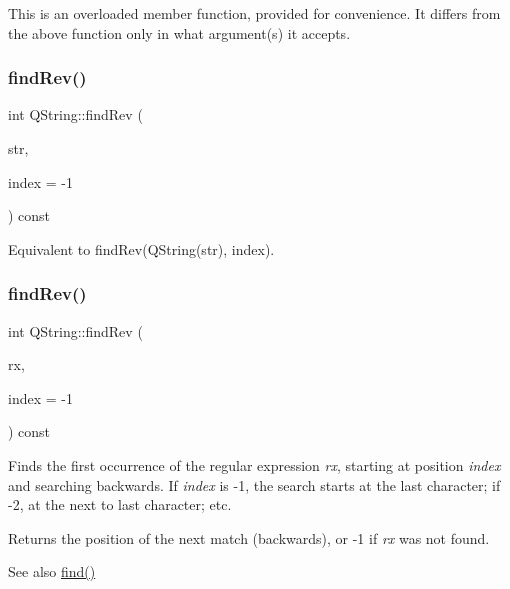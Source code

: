 This is an overloaded member function, provided for convenience. It differs from the above function only in what argument(s) it accepts. \mbox{\label{class_q_string_a1feec4e6b662ef6dee407ec85ffee9d9}} 
\subsubsection{\texorpdfstring{findRev()}{findRev()}\hspace{0.1cm}{\footnotesize\ttfamily [2/5]}}
{\footnotesize\ttfamily int Q\+String\+::find\+Rev (\begin{DoxyParamCaption}\item[{const char $\ast$}]{str,  }\item[{int}]{index = {\ttfamily -\/1} }\end{DoxyParamCaption}) const\hspace{0.3cm}{\ttfamily [inline]}}

Equivalent to find\+Rev(\+Q\+String(str), index). \mbox{\label{class_q_string_a678d778450575709d552d7be4316d68c}} 
\subsubsection{\texorpdfstring{findRev()}{findRev()}\hspace{0.1cm}{\footnotesize\ttfamily [3/5]}}
{\footnotesize\ttfamily int Q\+String\+::find\+Rev (\begin{DoxyParamCaption}\item[{const \mbox{\hyperlink{class_q_reg_exp}{Q\+Reg\+Exp}} \&}]{rx,  }\item[{int}]{index = {\ttfamily -\/1} }\end{DoxyParamCaption}) const}

Finds the first occurrence of the regular expression {\itshape rx}, starting at position {\itshape index} and searching backwards. If {\itshape index} is -\/1, the search starts at the last character; if -\/2, at the next to last character; etc.

Returns the position of the next match (backwards), or -\/1 if {\itshape rx} was not found.

\begin{DoxySeeAlso}{See also}
\mbox{\hyperlink{class_q_string_a675617012888ffd3acc8aef4aed05690}{find()}} 
\end{DoxySeeAlso}
\mbox{\label{class_q_string_abd18b44d7313c0ef3160d69d1b936ad5}} 
